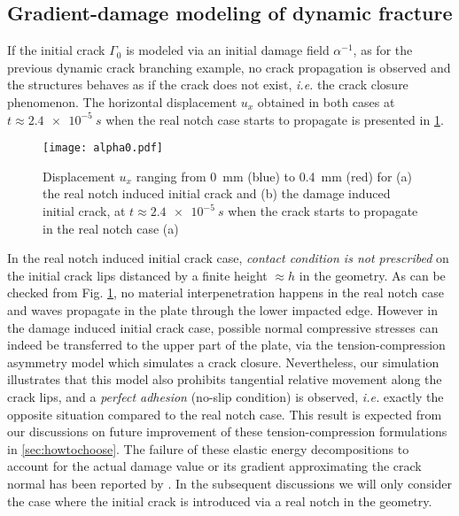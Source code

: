 \subsection{Gradient-damage modeling of dynamic fracture}
If the initial crack $\Gamma_0$ is modeled via an initial damage field $\alpha^{-1}$, as for the previous dynamic crack branching example, no crack propagation is observed and the structures behaves as if the crack does not exist, \emph{i.e.} the crack closure phenomenon. The horizontal displacement $u_x$ obtained in both cases at $t\approx\SI{2.4e-5}{s}$ when the real notch case starts to propagate is presented in \cref{fig:alpha0}.
\begin{figure}[htbp]
\centering
\texttt{[image: alpha0.pdf]}
\caption{Displacement $u_x$ ranging from \SI{0}{mm} (blue) to \SI{0.4}{mm} (red) for (a) the real notch induced initial crack and (b) the damage induced initial crack, at $t\approx\SI{2.4e-5}{s}$ when the crack starts to propagate in the real notch case (a)} \label{fig:alpha0}
\end{figure}
In the real notch induced initial crack case, \emph{contact condition is not prescribed} on the initial crack lips distanced by a finite height $\approx h$ in the geometry. As can be checked from Fig. \ref{fig:alpha0}, no material interpenetration happens in the real notch case and waves propagate in the plate through the lower impacted edge. However in the damage induced initial crack case, possible normal compressive stresses can indeed be transferred to the upper part of the plate, via the tension-compression asymmetry model \cite{FreddiRoyer-Carfagni:2010} which simulates a crack closure. Nevertheless, our simulation illustrates that this model also prohibits tangential relative movement along the crack lips, and a \emph{perfect adhesion} (no-slip condition) is observed, \emph{i.e.} exactly the opposite situation compared to the real notch case. This result is expected from our discussions on future improvement of these tension-compression formulations in \cref{sec:howtochoose}. The failure of these elastic energy decompositions to account for the actual damage value or its gradient approximating the crack normal has been reported by \cite{MayVignolletBorst:2015}. In the subsequent discussions we will only consider the case where the initial crack is introduced via a real notch in the geometry.

